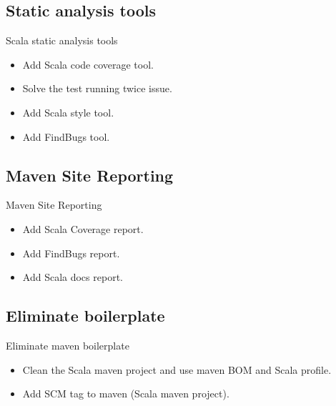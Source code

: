 \documentclass[aspectratio=169]{beamer}
\begin{document}
    \subsection{Static analysis tools}\label{subsec:static-analysis-tools}
    \begin{frame}{Scala static analysis tools}
        \begin{itemize}[<+- | alert@+>]
            \item Add Scala code coverage tool.
            \item Solve the test running twice issue.
            \item Add Scala style tool.
            \item Add FindBugs tool.
        \end{itemize}
    \end{frame}

    \subsection{Maven Site Reporting}\label{subsec:maven-site-reporting}
    \begin{frame}{Maven Site Reporting}
        \begin{itemize}[<+- | alert@+>]
            \item Add Scala Coverage report.
            \item Add FindBugs report.
            \item Add Scala docs report.
        \end{itemize}
    \end{frame}

    \subsection{Eliminate boilerplate}\label{subsec:eliminate-boilerplate}
    \begin{frame}{Eliminate maven boilerplate}
        \begin{itemize}[<+- | alert@+>]
            \item Clean the Scala maven project and use maven BOM and Scala profile.
            \item Add SCM tag to maven (Scala maven project).
        \end{itemize}
    \end{frame}
\end{document}
